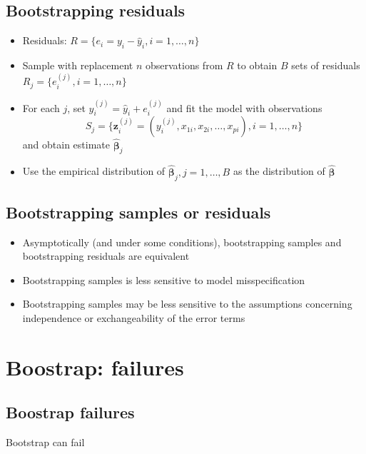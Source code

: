 \documentclass[]{article}
\providecommand{\tightlist}{%
  \setlength{\itemsep}{0pt}\setlength{\parskip}{0pt}}
\begin{document}
\subsection{Bootstrapping residuals}\label{bootstrapping-residuals}

\begin{itemize}
\tightlist
\item
  Residuals: \(R=\{e_i=y_i-\hat{y}_i,i=1,\ldots,n\}\)
\item
  Sample with replacement \(n\) observations from \(R\) to obtain \(B\)
  sets of residuals \(R_j=\{e_i^{(j)},i=1,\ldots,n\}\)
\item
  For each \(j\), set \(y_i^{(j)}=\hat{y}_i+e_i^{(j)}\) and fit the
  model with observations
  \[S_j=\{\mathbf{z}_i^{(j)}=(y_i^{(j)},x_{1i},x_{2i},\ldots,x_{pi}),i=1,\ldots,n\}\]
  and obtain estimate \(\hat{\boldsymbol{\beta}}_j\)
\item
  Use the empirical distribution of
  \(\hat{\boldsymbol{\beta}}_j,j=1,\ldots,B\) as the distribution of
  \(\hat{\boldsymbol{\beta}}\)
\end{itemize}

\subsection{Bootstrapping samples or
residuals}\label{bootstrapping-samples-or-residuals}

\begin{itemize}
\item
  Asymptotically (and under some conditions), bootstrapping samples and
  bootstrapping residuals are equivalent
\item
  Bootstrapping samples is less sensitive to model misspecification
\item
  Bootstrapping samples may be less sensitive to the assumptions
  concerning independence or exchangeability of the error terms
\end{itemize}

\section{Boostrap: failures}\label{boostrap-failures}

\subsection{Boostrap failures}\label{boostrap-failures-1}

Bootstrap can fail
\end{document}
